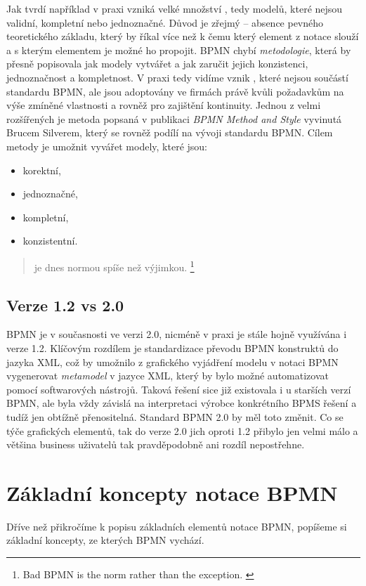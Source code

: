 Jak tvrdí například \cite{Silver2011} v praxi vzniká velké množství , tedy modelů, které nejsou validní, kompletní nebo jednoznačné. Důvod je zřejmý – absence pevného teoretického základu, který by říkal více než k čemu který element z notace slouží a s kterým elementem je možné ho propojit. BPMN chybí \textit{metodologie}, která by přesně popisovala jak modely vytvářet a jak zaručit jejich konzistenci, jednoznačnost a kompletnost. V praxi tedy vidíme vznik , které nejsou součástí standardu BPMN, ale jsou adoptovány ve firmách právě kvůli požadavkům na výše zmíněné vlastnosti a rovněž pro zajištění kontinuity. Jednou z velmi rozšířených je metoda popsaná v publikaci \textit{BPMN Method and Style} vyvinutá Brucem Silverem, který se rovněž podílí na vývoji standardu BPMN. Cílem metody je umožnit vyvářet modely, které jsou:

\begin{itemize}
\item korektní,
\item jednoznačné,
\item kompletní,
\item konzistentní.
\end{itemize}

\begin{quote}
 je dnes normou spíše než výjimkou. \cite{Silver2011}
\footnote{Bad BPMN is the norm rather than the exception. \cite{Silver2011}}
\end{quote}

\subsection{Verze 1.2 vs 2.0}
BPMN je v současnosti ve verzi 2.0, nicméně v praxi je stále hojně využívána i verze 1.2. Klíčovým rozdílem je standardizace převodu BPMN konstruktů do jazyka XML, což by umožnilo z grafického vyjádření modelu v notaci BPMN vygenerovat \textit{metamodel} v jazyce XML, který by bylo možné automatizovat pomocí softwarových nástrojů. Taková řešení sice již existovala i u starších verzí BPMN, ale byla vždy závislá na interpretaci výrobce konkrétního BPMS řešení a tudíž jen obtížně přenositelná. Standard BPMN 2.0 by měl toto změnit. Co se týče grafických elementů, tak do verze 2.0 jich oproti 1.2 přibylo jen velmi málo a většina business uživatelů tak pravděpodobně ani rozdíl nepostřehne.

\section{Základní koncepty notace BPMN}
Dříve než přikročíme k popisu základních elementů notace BPMN, popíšeme si základní koncepty, ze kterých BPMN vychází.

